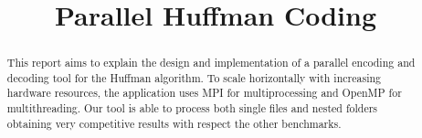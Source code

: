 \documentclass[conference]{IEEEtran}
\begin{document}
\title{Parallel Huffman Coding}

\author{
    \and
}

\maketitle

\thispagestyle{plain}
\pagestyle{plain}

\begin{abstract}
    This report aims to explain the design and implementation of a parallel encoding and decoding tool for the Huffman algorithm.
    To scale horizontally with increasing hardware resources, the application uses MPI for multiprocessing and OpenMP for multithreading.
    Our tool is able to process both single files and nested folders obtaining very competitive results with respect the other benchmarks.
\end{abstract}






{}


\end{document}
